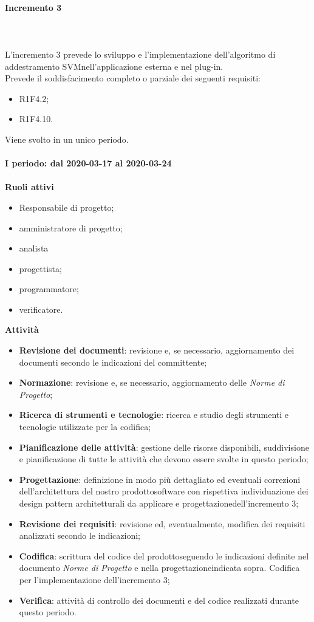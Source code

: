 \paragraph{Incremento 3} \mbox{} \\ \\ 
L'incremento 3 prevede lo sviluppo e l'implementazione dell'algoritmo di addestramento SVM\glosp nell'applicazione esterna e nel plug-in. 
\\Prevede il soddisfacimento completo o parziale dei seguenti requisiti:
\begin{itemize}
	\item R1F4.2;
	\item R1F4.10.
\end{itemize}
Viene svolto in un unico periodo.
\mbox{} \\ \\ \textbf{I periodo: dal 2020-03-17 al 2020-03-24} \mbox{} \\ \\
\textbf{Ruoli attivi}
\begin{itemize}
	\item Responsabile di progetto\glo;
	\item amministratore di progetto\glo;
	\item analista
	\item progettista;
	\item programmatore;
	\item verificatore.
\end{itemize}
\textbf{Attività} 
\begin{itemize}
	\item \textbf{Revisione dei documenti}: revisione e, se necessario, aggiornamento dei documenti secondo le indicazioni del committente;
	\item \textbf{Normazione}: revisione e, se necessario, aggiornamento delle \textit{Norme di Progetto};
	\item \textbf{Ricerca di strumenti e tecnologie}: ricerca e studio degli strumenti e tecnologie utilizzate per la codifica;
	\item \textbf{Pianificazione delle attività}: gestione delle risorse disponibili, suddivisione e pianificazione di tutte le attività che devono essere svolte in questo periodo;
	\item \textbf{Progettazione}\glo: definizione in modo più dettagliato ed eventuali correzioni dell'architettura del nostro prodotto\glosp software con rispettiva individuazione dei design pattern architetturali da applicare e progettazione\glosp dell'incremento 3; 
	\item \textbf{Revisione dei requisiti}: revisione ed, eventualmente, modifica dei requisiti analizzati secondo le indicazioni; 
	\item \textbf{Codifica}: scrittura del codice del prodotto\glosp seguendo le indicazioni definite nel documento \textit{Norme di Progetto} e nella progettazione\glosp indicata sopra. Codifica per l'implementazione dell'incremento 3; 
	\item \textbf{Verifica}: attività di controllo dei documenti e del codice realizzati durante questo periodo.
\end{itemize}
